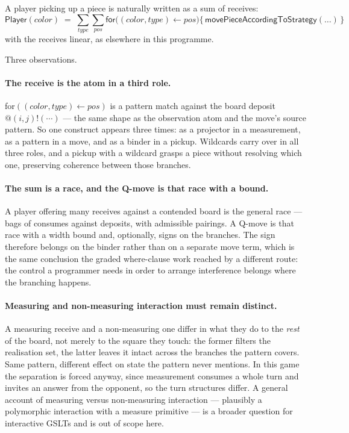 \documentclass[11pt,a4paper]{article}
\theoremstyle{definition}
\theoremstyle{plain}
\begin{document}
A player picking up a piece is naturally written as a sum of receives:
\[
  \textsf{Player}(\textit{color}) \;=\;
  \sum_{\textit{type}} \sum_{\textit{pos}}
  \textsf{for}\big((\textit{color},\textit{type}) \leftarrow \textit{pos}\big)
  \{\, \textsf{movePieceAccordingToStrategy}(\ldots) \,\}
\]
with the receives linear, as elsewhere in this programme.

Three observations.

\paragraph{The receive is the atom in a third role.}
\textsf{for}$((\textit{color},\textit{type}) \leftarrow \textit{pos})$ is a
pattern match against the board deposit $@(i,j)!(\cdots)$ --- the same shape as
the observation atom and the move's source pattern. So one construct appears
three times: as a projector in a measurement, as a pattern in a move, and as a
binder in a pickup. Wildcards carry over in all three roles, and a pickup with
a wildcard grasps a piece without resolving which one, preserving coherence
between those branches.

\paragraph{The sum is a race, and the Q-move is that race with a bound.}
A player offering many receives against a contended board is the general race
--- bags of consumes against deposits, with admissible pairings. A Q-move is
that race with a width bound and, optionally, signs on the branches. The sign
therefore belongs on the binder rather than on a separate move term, which is
the same conclusion the graded where-clause work reached by a different route:
the control a programmer needs in order to arrange interference belongs where
the branching happens.

\paragraph{Measuring and non-measuring interaction must remain distinct.}
A measuring receive and a non-measuring one differ in what they do to the
\emph{rest} of the board, not merely to the square they touch: the former
filters the realisation set, the latter leaves it intact across the branches
the pattern covers. Same pattern, different effect on state the pattern never
mentions. In this game the separation is forced anyway, since measurement
consumes a whole turn and invites an answer from the opponent, so the turn
structures differ. A general account of measuring versus non-measuring
interaction --- plausibly a polymorphic interaction with a measure primitive
--- is a broader question for interactive GSLTs and is out of scope here.
\end{document}
